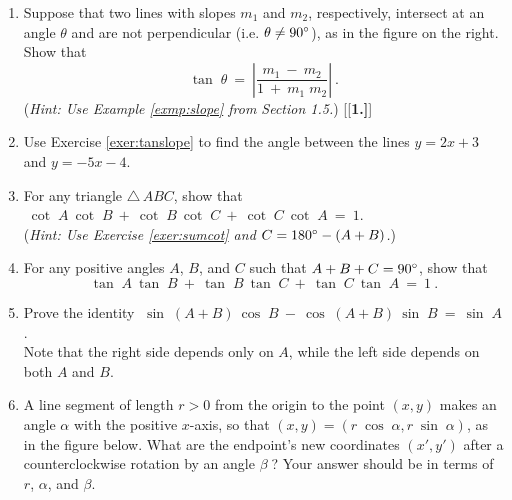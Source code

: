 {\begin{enumerate}[\bfseries 1.]
{}
 \item\label{exer:tanslope} Suppose that two lines with slopes $m_1$ and $m_2$, respectively,
  intersect at an angle $\theta$ and are not perpendicular (i.e. $\theta \ne 90^\circ$), as in
  the figure on the right. Show that
  \begin{displaymath}
   \tan\;\theta ~=~ \left| \frac{m_1 ~-~ m_2}{1 ~+~ m_1 \; m_2} \right| ~.
  \end{displaymath}
 (\emph{Hint: Use Example \ref{exmp:slope} from Section 1.5.})
[{[\bfseries 1.]}]
 \item Use Exercise \ref{exer:tanslope} to find the angle between the lines $y=2x+3$ and $y=-5x-4$.
 \item For any triangle $\triangle\,ABC$, show that $\;\cot\;A~\cot\;B ~+~ \cot\;B~\cot\;C ~+~
 \cot\;C~\cot\;A ~=~ 1$.\\(\emph{Hint: Use Exercise \ref{exer:sumcot} and $C=180^\circ - (A+B)$.})
 \item For any positive angles $A$, $B$, and $C$ such that $A+B+C=90^\circ$, show that
 \begin{displaymath}
  \tan\;A~\tan\;B ~+~ \tan\;B~\tan\;C ~+~ \tan\;C~\tan\;A ~=~ 1 ~.
 \end{displaymath}
 \item Prove the identity
    $\;\sin\;(A+B)~\cos\;B ~-~ \cos\;(A+B)~\sin\;B ~=~ \sin\;A$.\\Note
  that the right side depends only on $A$, while the left side depends on both $A$ and $B$.
 \item A line segment of length $r > 0$ from the origin to the point
  $(x,y)$ makes an angle $\alpha$ with the positive $x$-axis, so that
  $(x,y) = (r\;\cos\;\alpha,r\;\sin\;\alpha)$, as in the figure below.
  What are the endpoint's new coordinates $(x',y')$ after a counterclockwise rotation by an angle
  $\beta\;$?
  Your answer should be in terms of $r$, $\alpha$, and $\beta$.


\end{enumerate}}
